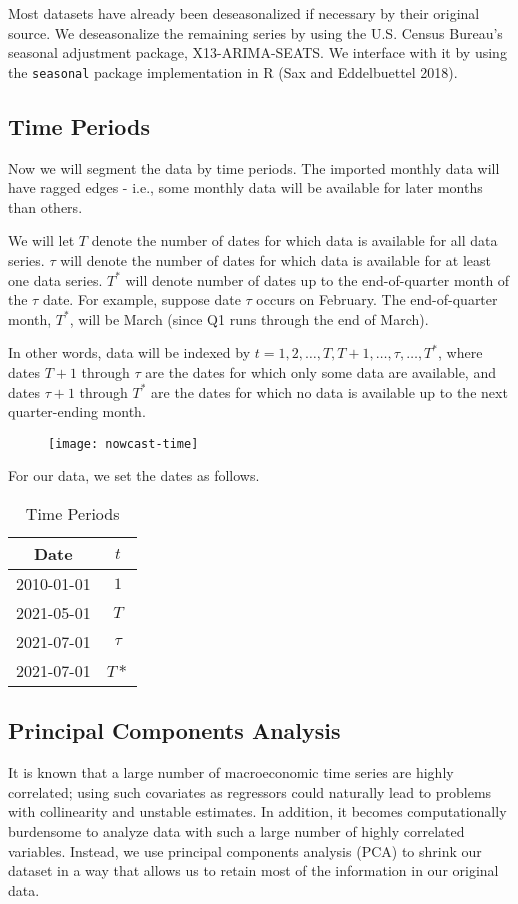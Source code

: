 \documentclass[11pt, letterpaper]{article}\usepackage[]{graphicx}\usepackage[]{color}
\begin{document}
Most datasets have already been deseasonalized if necessary by their original source. We deseasonalize the remaining series by using the U.S. Census Bureau's seasonal adjustment package, X13-ARIMA-SEATS. We interface with it by using the \texttt{seasonal} package implementation in R (Sax and Eddelbuettel 2018).

\subsection{Time Periods}
Now we will segment the data by time periods. The imported monthly data will have ragged edges - i.e., some monthly data will be available for later months than others.

We will let $T$ denote the number of dates for which data is available for all data series. $\tau$ will denote the number of dates for which data is available for at least one data series. $T^*$ will denote number of dates up to the end-of-quarter month of the $\tau$ date. For example, suppose date $\tau$ occurs on February. The end-of-quarter month, $T^*$, will be March (since Q1 runs through the end of March). 

In other words, data will be indexed by $t = 1, 2, \dots, T, T+1, \dots, \tau, \dots, T^*$, where dates $T + 1$ through $\tau$ are the dates for which only some data are available, and dates $\tau + 1$ through $T^*$ are the dates for which no data is available up to the next quarter-ending month.
\begin{figure}[H]
\texttt{[image: nowcast-time]}
\centering
\end{figure}
For our data, we set the dates as follows.
\begin{table}[H]
\centering
\begingroup\footnotesize
\begin{tabular}{cc}
  \hline
Date & $t$ \\ 
  \hline
2010-01-01 & $1$ \\ 
  2021-05-01 & $T$ \\ 
  2021-07-01 & $\tau$ \\ 
  2021-07-01 & $T*$ \\ 
   \hline
\end{tabular}
\endgroup
\caption{Time Periods} 
\end{table}


\subsection{Principal Components Analysis}
It is known that a large number of macroeconomic time series are highly correlated; using such covariates as regressors could naturally lead to problems with collinearity and unstable estimates. In addition, it becomes computationally burdensome to analyze data with such a large number of highly correlated variables. Instead, we use principal components analysis (PCA) to shrink our dataset in a way that allows us to retain most of the information in our original data.
\end{document}
